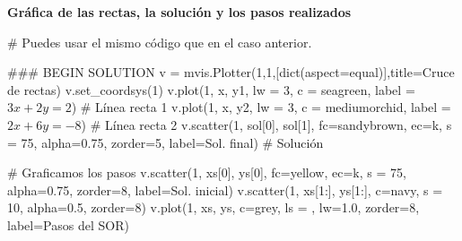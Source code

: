 \documentclass[
  letterpaper,
  DIV=11,
  numbers=noendperiod]{scrreprt}
\newenvironment{Shaded}{\begin{snugshade}}{\end{snugshade}}
\newcommand{\BuiltInTok}[1]{\textcolor[rgb]{0.00,0.23,0.31}{#1}}
\newcommand{\CommentTok}[1]{\textcolor[rgb]{0.37,0.37,0.37}{#1}}
\newcommand{\DecValTok}[1]{\textcolor[rgb]{0.68,0.00,0.00}{#1}}
\newcommand{\FloatTok}[1]{\textcolor[rgb]{0.68,0.00,0.00}{#1}}
\newcommand{\NormalTok}[1]{\textcolor[rgb]{0.00,0.23,0.31}{#1}}
\newcommand{\OperatorTok}[1]{\textcolor[rgb]{0.37,0.37,0.37}{#1}}
\newcommand{\RegionMarkerTok}[1]{\textcolor[rgb]{0.00,0.23,0.31}{#1}}
\newcommand{\StringTok}[1]{\textcolor[rgb]{0.13,0.47,0.30}{#1}}
\begin{document}
\textbf{Gráfica de las rectas, la solución y los pasos realizados}

\begin{Shaded}
\begin{Highlighting}[]
\CommentTok{\# Puedes usar el mismo código que en el caso anterior.}

\CommentTok{\#\#\# }\RegionMarkerTok{BEGIN}\CommentTok{ SOLUTION}
\NormalTok{v }\OperatorTok{=}\NormalTok{ mvis.Plotter(}\DecValTok{1}\NormalTok{,}\DecValTok{1}\NormalTok{,[}\BuiltInTok{dict}\NormalTok{(aspect}\OperatorTok{=}\StringTok{\textquotesingle{}equal\textquotesingle{}}\NormalTok{)],title}\OperatorTok{=}\StringTok{\textquotesingle{}Cruce de rectas\textquotesingle{}}\NormalTok{) }
\NormalTok{v.set\_coordsys(}\DecValTok{1}\NormalTok{)}
\NormalTok{v.plot(}\DecValTok{1}\NormalTok{, x, y1, lw }\OperatorTok{=} \DecValTok{3}\NormalTok{, c }\OperatorTok{=} \StringTok{\textquotesingle{}seagreen\textquotesingle{}}\NormalTok{, label }\OperatorTok{=} \StringTok{\textquotesingle{}$3x+2y=2$\textquotesingle{}}\NormalTok{) }\CommentTok{\# Línea recta 1}
\NormalTok{v.plot(}\DecValTok{1}\NormalTok{, x, y2, lw }\OperatorTok{=} \DecValTok{3}\NormalTok{, c }\OperatorTok{=} \StringTok{\textquotesingle{}mediumorchid\textquotesingle{}}\NormalTok{, label }\OperatorTok{=} \StringTok{\textquotesingle{}$2x+6y={-}8$\textquotesingle{}}\NormalTok{) }\CommentTok{\# Línea recta 2}
\NormalTok{v.scatter(}\DecValTok{1}\NormalTok{, sol[}\DecValTok{0}\NormalTok{], sol[}\DecValTok{1}\NormalTok{], fc}\OperatorTok{=}\StringTok{\textquotesingle{}sandybrown\textquotesingle{}}\NormalTok{, ec}\OperatorTok{=}\StringTok{\textquotesingle{}k\textquotesingle{}}\NormalTok{, s }\OperatorTok{=} \DecValTok{75}\NormalTok{, alpha}\OperatorTok{=}\FloatTok{0.75}\NormalTok{, zorder}\OperatorTok{=}\DecValTok{5}\NormalTok{, label}\OperatorTok{=}\StringTok{\textquotesingle{}Sol. final\textquotesingle{}}\NormalTok{) }\CommentTok{\# Solución}

\CommentTok{\# Graficamos los pasos}
\NormalTok{v.scatter(}\DecValTok{1}\NormalTok{, xs[}\DecValTok{0}\NormalTok{], ys[}\DecValTok{0}\NormalTok{], fc}\OperatorTok{=}\StringTok{\textquotesingle{}yellow\textquotesingle{}}\NormalTok{, ec}\OperatorTok{=}\StringTok{\textquotesingle{}k\textquotesingle{}}\NormalTok{, s }\OperatorTok{=} \DecValTok{75}\NormalTok{, alpha}\OperatorTok{=}\FloatTok{0.75}\NormalTok{, zorder}\OperatorTok{=}\DecValTok{8}\NormalTok{, label}\OperatorTok{=}\StringTok{\textquotesingle{}Sol. inicial\textquotesingle{}}\NormalTok{)}
\NormalTok{v.scatter(}\DecValTok{1}\NormalTok{, xs[}\DecValTok{1}\NormalTok{:], ys[}\DecValTok{1}\NormalTok{:], c}\OperatorTok{=}\StringTok{\textquotesingle{}navy\textquotesingle{}}\NormalTok{, s }\OperatorTok{=} \DecValTok{10}\NormalTok{, alpha}\OperatorTok{=}\FloatTok{0.5}\NormalTok{, zorder}\OperatorTok{=}\DecValTok{8}\NormalTok{)}
\NormalTok{v.plot(}\DecValTok{1}\NormalTok{, xs, ys, c}\OperatorTok{=}\StringTok{\textquotesingle{}grey\textquotesingle{}}\NormalTok{, ls }\OperatorTok{=} \StringTok{\textquotesingle{}{-}{-}\textquotesingle{}}\NormalTok{, lw}\OperatorTok{=}\FloatTok{1.0}\NormalTok{, zorder}\OperatorTok{=}\DecValTok{8}\NormalTok{, label}\OperatorTok{=}\StringTok{\textquotesingle{}Pasos del SOR\textquotesingle{}}\NormalTok{)}
        

\end{Highlighting}
\end{Shaded}
\end{document}
